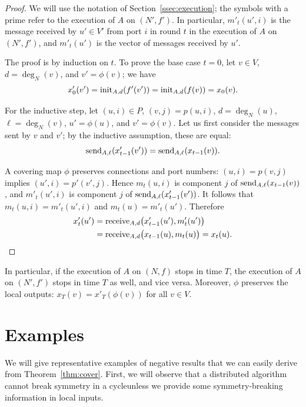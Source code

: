 \begin{proof}
    We will use the notation of Section~\ref{ssec:execution}; the symbols with a prime refer to the execution of $A$ on $(N'\!,f')$. In particular, $m'_t(u',i)$ is the message received by $u' \in V'$ from port $i$ in round $t$ in the execution of $A$ on $(N'\!,f')$, and $m'_t(u')$ is the vector of messages received by $u'$.
    
    The proof is by induction on $t$. To prove the base case $t = 0$, let $v \in V$, $d = \deg_N(v)$, and $v' = \phi(v)$; we have
    \[
        x'_0(v') = \operatorname{init}_{A,d}(f'(v')) = \operatorname{init}_{A,d}(f(v)) = x_0(v).
    \]
    
    For the inductive step, let $(u,i) \in P$, $(v,j) = p(u,i)$, $d = \deg_N(u)$, $\ell = \deg_N(v)$, $u' = \phi(u)$, and $v' = \phi(v)$. Let us first consider the messages sent by $v$ and $v'$; by the inductive assumption, these are equal:
    \[
        \operatorname{send}_{A,\ell}(x'_{t-1}(v')) = \operatorname{send}_{A,\ell}(x_{t-1}(v)).
    \]
    
    A covering map $\phi$ preserves connections and port numbers: $(u,i) = p(v,j)$ implies $(u',i) = p'(v',j)$. Hence $m_t(u,i)$ is component $j$ of $\operatorname{send}_{A,\ell}(x_{t-1}(v))$, and $m'_t(u',i)$ is component $j$ of $\operatorname{send}_{A,\ell}(x'_{t-1}(v'))$. It follows that $m_t(u,i) = m'_t(u',i)$ and $m_t(u) = m'_t(u')$. Therefore
    \begin{align*}
        x'_t(u')
        &= \operatorname{receive}_{A,d}\bigl(x'_{t-1}(u'), m'_t(u') \bigr) \\
        &= \operatorname{receive}_{A,d}\bigl(x_{t-1}(u), m_t(u) \bigr)
        = x_t(u). \qedhere
    \end{align*}
\end{proof}

In particular, if the execution of $A$ on $(N,f)$ stops in time $T$, the execution of $A$ on $(N'\!,f')$ stops in time $T$ as well, and vice versa. Moreover, $\phi$ preserves the local outputs: $x_T(v) = x'_T(\phi(v))$ for all $v \in V$.

\section{Examples}

We will give representative examples of negative results that we can easily derive from Theorem~\ref{thm:cover}. First, we will observe that a distributed algorithm cannot break symmetry in a cycle\mydash unless we provide some symmetry-breaking information in local inputs.

